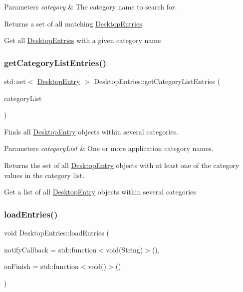 \begin{DoxyParams}{Parameters}
{\em category} & The category name to search for.\\
\hline
\end{DoxyParams}
\begin{DoxyReturn}{Returns}
a set of all matching \mbox{\hyperlink{classDesktopEntries}{Desktop\+Entries}}
\end{DoxyReturn}
Get all \mbox{\hyperlink{classDesktopEntries}{Desktop\+Entries}} with a given category name \mbox{\label{classDesktopEntries_acc37ea433350d3be03a4665a14ce8b97}} 
\subsubsection{\texorpdfstring{get\+Category\+List\+Entries()}{getCategoryListEntries()}}
{\footnotesize\ttfamily std\+::set$<$ \mbox{\hyperlink{classDesktopEntry}{Desktop\+Entry}} $>$ Desktop\+Entries\+::get\+Category\+List\+Entries (\begin{DoxyParamCaption}\item[{String\+Array}]{category\+List }\end{DoxyParamCaption})}

Finds all \mbox{\hyperlink{classDesktopEntry}{Desktop\+Entry}} objects within several categories.


\begin{DoxyParams}{Parameters}
{\em category\+List} & One or more application category names.\\
\hline
\end{DoxyParams}
\begin{DoxyReturn}{Returns}
the set of all \mbox{\hyperlink{classDesktopEntry}{Desktop\+Entry}} objects with at least one of the category values in the category list.
\end{DoxyReturn}
Get a list of all \mbox{\hyperlink{classDesktopEntry}{Desktop\+Entry}} objects within several categories \mbox{\label{classDesktopEntries_a719f4190cf4c0fcc9edb807c8b5814ba}} 
\subsubsection{\texorpdfstring{load\+Entries()}{loadEntries()}}
{\footnotesize\ttfamily void Desktop\+Entries\+::load\+Entries (\begin{DoxyParamCaption}\item[{std\+::function$<$ void(String) $>$}]{notify\+Callback = {\ttfamily std\+:\+:function$<$void(String)$>$()},  }\item[{std\+::function$<$ void() $>$}]{on\+Finish = {\ttfamily std\+:\+:function$<$void()$>$()} }\end{DoxyParamCaption})}

